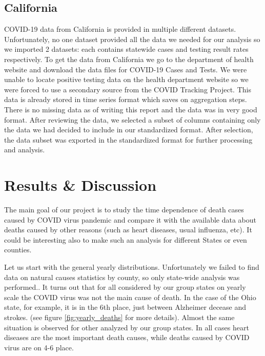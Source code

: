 \documentclass[conference]{IEEEtran}
\begin{document}
\subsection{California}


COVID-19 data from California is provided in multiple different datasets.
Unfortunately, no one dataset provided all the data we needed for our analysis so we imported 2 datasets: each contains statewide cases and testing result rates respectively.
To get the data from California we go to the department of health website and download the data files for COVID-19 Cases and Tests.
We were unable to locate positive testing data on the health department website so we were forced to use a secondary source from the COVID Tracking Project.
This data is already stored in time series format which saves on aggregation steps.
There is no missing data as of writing this report and the data was in very good format. After reviewing the data, we selected a subset of columns containing only the data we had decided to include in our standardized format. After selection, the data subset was exported in the standardized format for further processing and analysis.

\section{ Results \& Discussion }

The main goal of our project is to study the time dependence of death cases caused by COVID virus pandemic and compare it with the available data about deaths caused by other reasons (such as heart diseases, usual influenza, etc). It could be interesting also to make such an analysis for different States or even counties.

Let us start with the general yearly distributions. Unfortunately we failed to find data on natural causes statistics by county, so only state-wide analysis was performed.. It turns out that for all considered by our group states on yearly scale the COVID virus was not the main cause of death. In the case of the Ohio state, for example, it is in the 6th place, just between Alzheimer decease and strokes. (see figure \ref{fig:yearly_deaths} for more details). Almost the same situation is observed for other analyzed by our group states. In all cases heart diseases are the most important death causes, while deaths caused by COVID virus are on 4-6 place.
\end{document}
